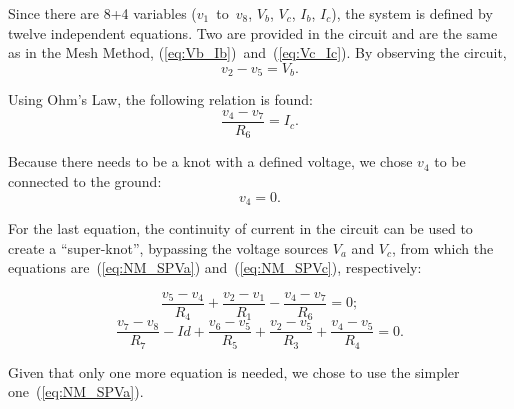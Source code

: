 Since there are 8+4 variables ($v_1$~to~$v_8$, $V_b$, $V_c$, $I_b$, $I_c$), the system is defined by twelve independent equations. Two are provided in the circuit and are the same as in the Mesh Method, (\ref{eq:Vb_Ib})~and~(\ref{eq:Vc_Ic}).
By observing the circuit,
\begin{equation}
  v_2 - v_5 = V_b.
  \label{eq:NM_Vb}
\end{equation}

Using Ohm’s Law, the following relation is found:
\begin{equation}
  \frac{v_4-v_7}{R_6} = I_c.
  \label{eq:NM_OhmIc}
\end{equation}

Because there needs to be a knot with a defined voltage, we chose $v_4$ to be connected to the ground:
\begin{equation}
  v_4 = 0.
  \label{eq:NM_v4=0}
\end{equation}

For the last equation, the continuity of current in the circuit can be used to create a “super-knot”, bypassing the voltage sources $V_a$ and $V_c$, from which the equations are~(\ref{eq:NM_SPVa}) and~(\ref{eq:NM_SPVc}), respectively:

\begin{equation}
  \frac{v_5-v_4}{R_4} + \frac{v_2-v_1}{R_1} - \frac{v_4-v_7}{R_6} = 0;
  \label{eq:NM_SPVa}
\end{equation}
\begin{equation}
  \frac{v_7-v_8}{R_7} - Id + \frac{v_6-v_5}{R_5} + \frac{v_2-v_5}{R_3} + \frac{v_4-v_5}{R_4} = 0.
  \label{eq:NM_SPVc}
\end{equation}

Given that only one more equation is needed, we chose to use the simpler one~(\ref{eq:NM_SPVa}).

